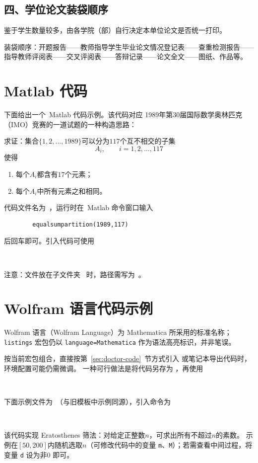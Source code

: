 \section*{四、学位论文装袋顺序}
鉴于学生数量较多，由各学院（部）自行决定本单位论文是否统一打印。

装袋顺序：开题报告——教师指导学生毕业论文情况登记表——查重检测报告——指导教师评阅表——交叉评阅表——答辩记录——论文全文——图纸、作品等。

\chapter{Matlab 代码}\label{app:code-matlab}
下面给出一个~Matlab 代码示例。该代码对应
1989年第30届国际数学奥林匹克（IMO）竞赛的一道试题的一种构造思路：\vspace{.5cm}

\noindent 求证：集合$\{1, 2, \ldots, 1989\}$可以分为$117$个互不相交的子集
\[A_i, \qquad i = 1, 2, \ldots, 117\]
使得
\begin{enumerate}[label=\arabic*., leftmargin=2em]
    \item 每个$A_i$都含有$17$个元素；
    \item 每个$A_i$中所有元素之和相同。
\end{enumerate}

代码文件名为~，运行时在~Matlab 命令窗口输入
\begin{verbatim}
        equalsumpartition(1989,117)
\end{verbatim}
后回车即可。引入代码可使用
\begin{verbatim}
       
\end{verbatim}
注意：文件放在子文件夹~ 时，路径需写为~。



\chapter{Wolfram 语言代码示例}\label{app:code-wolfram}
\begingroup
\hfuzz=1pt\relax
Wolfram 语言（Wolfram Language）为 Mathematica 所采用的标准名称；%
\texttt{listings} 宏包仍以%
\texttt{language=Mathematica}%
作为语法高亮标识，并非笔误。
\par\endgroup
按当前宏包组合，直接按第~\ref{sec:doctor-code}~节方式引入  或笔记本导出代码时，环境配置可能仍需微调。
一种可行做法是将代码另存为 ，再使用
\begin{verbatim}
        
\end{verbatim}
下面示例文件为~（与旧模板中示例同源），引入命令为
\begin{verbatim}
       
\end{verbatim}
该代码实现 Eratosthenes 筛法：对给定正整数$n$，可求出所有不超过$n$的素数。
示例在$[50,200]$内随机选取$n$（可修改代码中的变量 \texttt{m}、\texttt{M}）；若需查看中间过程，将变量 \texttt{d} 设为非$0$ 即可。


